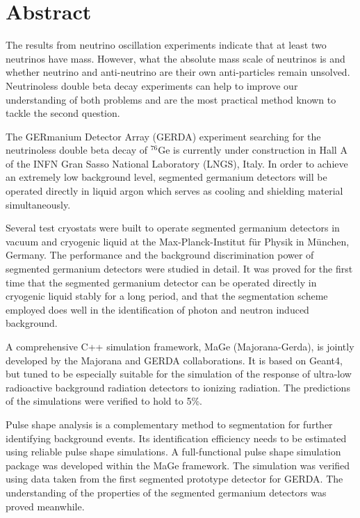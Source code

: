 \section*{Abstract}
The results from neutrino oscillation experiments indicate that at least two neutrinos have mass. However, what the absolute mass scale of neutrinos is and whether neutrino and anti-neutrino are their own anti-particles remain unsolved. Neutrinoless double beta decay experiments can help to improve our understanding of both problems and are the most practical method known to tackle the second question. 

The GERmanium Detector Array (GERDA) experiment searching for the neutrinoless double beta decay of $^{76}$Ge is currently under construction in Hall A of the INFN Gran Sasso National Laboratory (LNGS), Italy. In order to achieve an extremely low background level, segmented germanium detectors will be operated directly in liquid argon which serves as cooling and shielding material simultaneously. 

Several test cryostats were built to operate segmented germanium detectors in vacuum and cryogenic liquid at the Max-Planck-Institut f\"ur Physik in M\"unchen, Germany. The performance and the background discrimination power of segmented germanium detectors were studied in detail. It was proved for the first time that the segmented germanium detector can be operated directly in cryogenic liquid stably for a long period, and that the segmentation scheme employed does well in the identification of photon and neutron induced background.

A comprehensive C++ simulation framework, MaGe (Majorana-Gerda), is jointly developed by the Majorana and GERDA collaborations. It is based on Geant4, but tuned to be especially suitable for the simulation of the response of ultra-low radioactive background radiation detectors to ionizing radiation. The predictions of the simulations were verified to hold to 5\%.

Pulse shape analysis is a complementary method to segmentation for further identifying background events. Its identification efficiency needs to be estimated using reliable pulse shape simulations. A full-functional pulse shape simulation package was developed within the MaGe framework. The simulation was verified using data taken from the first segmented prototype detector for GERDA. The understanding of the properties of the segmented germanium detectors was proved meanwhile.

\clearpage


